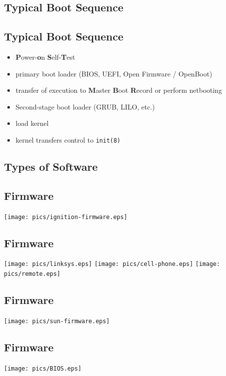 \documentclass[xga]{xdvislides}
\begin{document}
\subsection{Typical Boot Sequence}

\subsection{Typical Boot Sequence}
\begin{itemize}
	\item {\bf P}ower-{\bf o}n {\bf S}elf-{\bf T}est
	\item primary boot loader (BIOS, UEFI, Open Firmware / OpenBoot)
	\item transfer of execution to {\bf M}aster {\bf B}oot {\bf R}ecord or perform netbooting
	\item Second-stage boot loader (GRUB, LILO, etc.)
	\item load kernel
	\item kernel transfers control to {\tt init(8)}
\end{itemize}

\subsection{Types of Software}

\subsection{Firmware}
\begin{center}
	\texttt{[image: pics/ignition-firmware.eps]}
\end{center}

\subsection{Firmware}
\begin{center}
	\texttt{[image: pics/linksys.eps]}
	\texttt{[image: pics/cell-phone.eps]}
	\texttt{[image: pics/remote.eps]}
\end{center}

\subsection{Firmware}
\begin{center}
	\texttt{[image: pics/sun-firmware.eps]}
\end{center}

\subsection{Firmware}
\begin{center}
	\texttt{[image: pics/BIOS.eps]}
\end{center}
\end{document}
